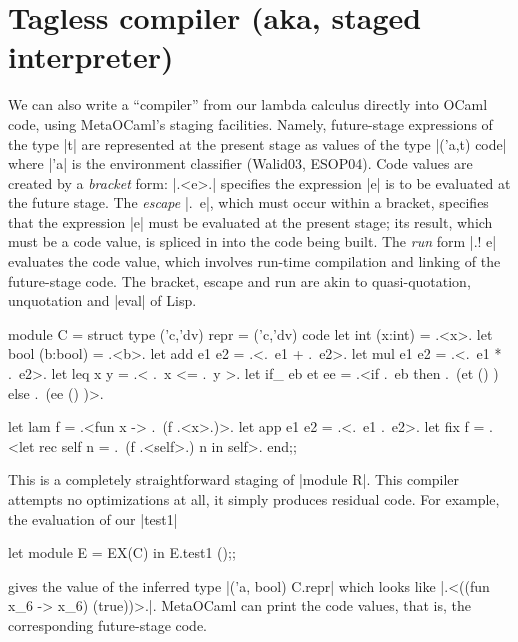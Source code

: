 \documentclass[preprint]{sigplanconf}
\begin{document}
\begin{comment}
module EX1(S: Symantics) = struct
 open S
 let tfix () = app (fix (fun self -> self)) (int 1)
end;;
let module E =EX1(R) in E.tfix ();;
let module E =EX1(L) in E.tfix ();;
\end{comment}

\section{Tagless compiler (aka, staged interpreter)}\label{compiler}

We can also write a ``compiler'' from our lambda calculus directly
into OCaml code, using MetaOCaml's staging facilities. Namely,
future-stage expressions of the type |t| are represented at the
present stage as values of the type |('a,t) code| where |'a| is the
environment classifier (Walid03, ESOP04). Code values are created by
a \emph{bracket} form: |.<e>.| specifies the expression |e| is to be
evaluated at the future stage. The \emph{escape} |.~e|, which must occur
within a bracket, specifies that the expression |e| must be evaluated
at the present stage; its result, which must be a code value, is
spliced in into the code being built. The \emph{run} form |.! e|
evaluates the code value, which involves run-time compilation and
linking of the future-stage code. The bracket, escape and run are akin to
quasi-quotation, unquotation and |eval| of Lisp.


\begin{code}
module C = struct
  type ('c,'dv) repr = ('c,'dv) code
  let int (x:int) = .<x>.
  let bool (b:bool) = .<b>.
  let add e1 e2 = .<.~e1 + .~e2>.
  let mul e1 e2 = .<.~e1 * .~e2>.
  let leq x y = .< .~x <= .~y >.
  let if_ eb et ee = 
    .<if .~eb then .~(et () ) else .~(ee () )>.

  let lam f = .<fun x -> .~(f .<x>.)>.
  let app e1 e2 = .<.~e1 .~e2>.
  let fix f = 
     .<let rec self n = .~(f .<self>.) n in self>.
end;;
\end{code}
This is a completely straightforward staging of
|module R|.
This compiler attempts no optimizations at all, it simply produces
residual code. For example, the evaluation of our |test1|
\begin{code}
  let module E = EX(C) in E.test1 ();;
\end{code}
gives the value of the inferred type |('a, bool) C.repr| which looks
like |.<((fun x_6 -> x_6) (true))>.|. MetaOCaml can print the code
values, that is, the corresponding future-stage code.
\end{document}
